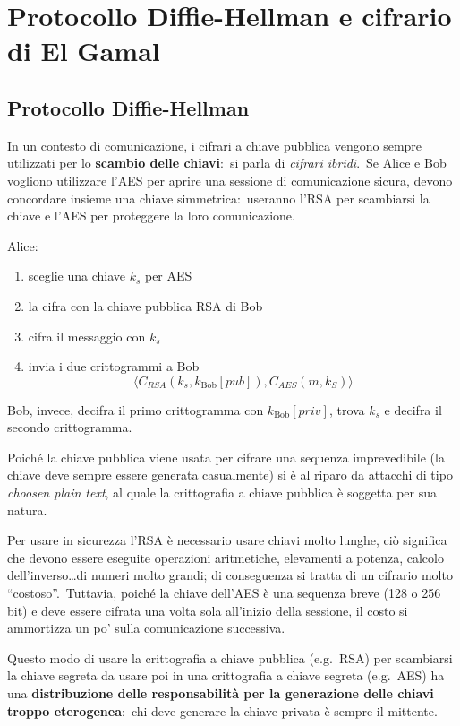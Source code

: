\chapter{Protocollo Diffie-Hellman e cifrario di El Gamal}

\section{Protocollo Diffie-Hellman}

In un contesto di comunicazione, i cifrari a chiave pubblica vengono sempre utilizzati per lo \textbf{scambio delle chiavi}:\ si parla di \textit{cifrari ibridi}.\
Se Alice e Bob vogliono utilizzare l'AES per aprire una sessione di comunicazione sicura, devono concordare insieme una chiave simmetrica:\ useranno l'RSA per scambiarsi la chiave e l'AES per proteggere la loro comunicazione.\

Alice:
\begin{enumerate}
    \item sceglie una chiave $k_s$ per AES
    \item la cifra con la chiave pubblica RSA di Bob
    \item cifra il messaggio con $k_s$
    \item invia i due crittogrammi a Bob
          \[\langle C_{\mathit{RSA}}\left(k_s, k_{\mathrm{Bob}}[\mathit{pub}]\right), C_{\mathit{AES}}(m, k_S)\rangle\]
\end{enumerate}

\noindent Bob, invece, decifra il primo crittogramma con $k_{\mathrm{Bob}}[\mathit{priv}]$, trova $k_s$ e decifra il secondo crittogramma.\

Poiché la chiave pubblica viene usata per cifrare una sequenza imprevedibile (la chiave deve sempre essere generata casualmente) si è al riparo da attacchi di tipo \textit{choosen plain text}, al quale la crittografia a chiave pubblica è soggetta per sua natura.\

Per usare in sicurezza l'RSA è necessario usare chiavi molto lunghe, ciò significa che devono essere eseguite operazioni aritmetiche, elevamenti a potenza, calcolo dell'inverso\dots di numeri molto grandi; di conseguenza si tratta di un cifrario molto ``costoso''.\
Tuttavia, poiché la chiave dell'AES è una sequenza breve (128 o 256 bit) e deve essere cifrata una volta sola all'inizio della sessione, il costo si ammortizza un po' sulla comunicazione successiva.\

Questo modo di usare la crittografia a chiave pubblica (e.g.\ RSA) per scambiarsi la chiave segreta da usare poi in una crittografia a chiave segreta (e.g.\ AES) ha una \textbf{distribuzione delle responsabilità per la generazione delle chiavi troppo eterogenea}:\ chi deve generare la chiave privata è sempre il mittente.

